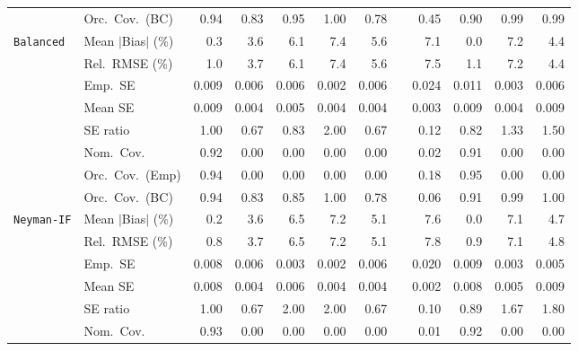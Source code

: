 \begin{landscape}
\begin{longtable}{llrrrrrrrrrr}
 & Orc.\ Cov.\ (BC) & \cellcolor{ranktwo}0.94 & 0.83 & \cellcolor{rankone}0.95 & 1.00 & 0.78 &  & 0.45 & 0.90 & \cellcolor{rankthree}0.99 & \cellcolor{rankthree}0.99 \\
\addlinespace[2pt]
\quad \texttt{Balanced} & Mean $|$Bias$|$ (\%) & \cellcolor{ranktwo}0.3 & \cellcolor{rankthree}3.6 & 6.1 & 7.4 & 5.6 &  & 7.1 & \cellcolor{rankone}0.0 & 7.2 & 4.4 \\
 & Rel.\ RMSE (\%) & \cellcolor{rankone}1.0 & \cellcolor{rankthree}3.7 & 6.1 & 7.4 & 5.6 &  & 7.5 & \cellcolor{ranktwo}1.1 & 7.2 & 4.4 \\
 & Emp.\ SE & 0.009 & 0.006 & 0.006 & 0.002 & 0.006 &  & 0.024 & 0.011 & 0.003 & 0.006 \\
 & Mean SE & 0.009 & 0.004 & 0.005 & 0.004 & 0.004 &  & 0.003 & 0.009 & 0.004 & 0.009 \\
 & SE ratio & \cellcolor{rankone}1.00 & 0.67 & \cellcolor{ranktwo}0.83 & 2.00 & 0.67 &  & 0.12 & \cellcolor{rankthree}0.82 & 1.33 & 1.50 \\
 & Nom.\ Cov. & \cellcolor{rankone}0.92 & 0.00 & 0.00 & 0.00 & 0.00 &  & \cellcolor{rankthree}0.02 & \cellcolor{ranktwo}0.91 & 0.00 & 0.00 \\
 & Orc.\ Cov.\ (Emp) & \cellcolor{ranktwo}0.94 & 0.00 & 0.00 & 0.00 & 0.00 &  & \cellcolor{rankthree}0.18 & \cellcolor{rankone}0.95 & 0.00 & 0.00 \\
 & Orc.\ Cov.\ (BC) & \cellcolor{rankone}0.94 & 0.83 & 0.85 & \cellcolor{rankthree}1.00 & 0.78 &  & 0.06 & \cellcolor{ranktwo}0.91 & \cellcolor{ranktwo}0.99 & \cellcolor{rankthree}1.00 \\
\addlinespace[2pt]
\quad \texttt{Neyman-IF} & Mean $|$Bias$|$ (\%) & \cellcolor{ranktwo}0.2 & \cellcolor{rankthree}3.6 & 6.5 & 7.2 & 5.1 &  & 7.6 & \cellcolor{rankone}0.0 & 7.1 & 4.7 \\
 & Rel.\ RMSE (\%) & \cellcolor{rankone}0.8 & \cellcolor{rankthree}3.7 & 6.5 & 7.2 & 5.1 &  & 7.8 & \cellcolor{ranktwo}0.9 & 7.1 & 4.8 \\
 & Emp.\ SE & 0.008 & 0.006 & 0.003 & 0.002 & 0.006 &  & 0.020 & 0.009 & 0.003 & 0.005 \\
 & Mean SE & 0.008 & 0.004 & 0.006 & 0.004 & 0.004 &  & 0.002 & 0.008 & 0.005 & 0.009 \\
 & SE ratio & \cellcolor{rankone}1.00 & \cellcolor{rankthree}0.67 & 2.00 & 2.00 & \cellcolor{rankthree}0.67 &  & 0.10 & \cellcolor{ranktwo}0.89 & 1.67 & 1.80 \\
 & Nom.\ Cov. & \cellcolor{rankone}0.93 & 0.00 & 0.00 & 0.00 & 0.00 &  & \cellcolor{rankthree}0.01 & \cellcolor{ranktwo}0.92 & 0.00 & 0.00 \\

\end{longtable}
\end{landscape}
